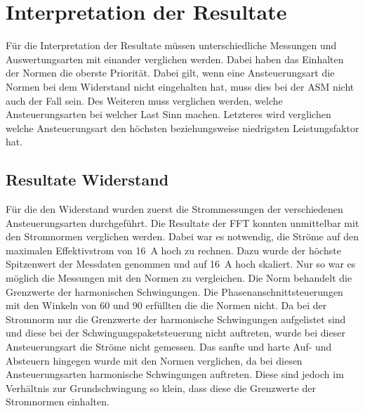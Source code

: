\section{Interpretation der Resultate}\label{sec:Interpretation_Resultate}
Für die Interpretation der Resultate müssen unterschiedliche Messungen und Auswertungsarten mit einander verglichen werden. Dabei haben das Einhalten der Normen die oberste Priorität. Dabei gilt, wenn eine Ansteuerungsart die Normen bei dem Widerstand nicht eingehalten hat, muss dies bei der ASM nicht auch der Fall sein. Des Weiteren muss verglichen werden, welche Ansteuerungsarten bei welcher Last Sinn machen. Letzteres wird verglichen welche Ansteuerungsart den höchsten beziehungsweise niedrigsten Leistungsfaktor hat. 

\subsection{Resultate Widerstand}
Für die den Widerstand wurden zuerst die Strommessungen der verschiedenen Ansteuerungsarten durchgeführt. Die Resultate der FFT konnten unmittelbar mit den Stromnormen  verglichen werden. Dabei war es notwendig, die Ströme auf den maximalen Effektivstrom von \SI{16}{A} hoch zu rechnen. Dazu wurde der höchste Spitzenwert der Messdaten genommen und auf \SI{16}{A} hoch skaliert. Nur so war es möglich die Messungen mit den Normen zu vergleichen. Die Norm behandelt die Grenzwerte der harmonischen Schwingungen. Die Phasenanschnittsteuerungen mit den Winkeln von 60\textdegree \hspace{0.02cm} und 90\textdegree \hspace{0.02cm} erfüllten die die Normen nicht. Da bei der Stromnorm nur die Grenzwerte der harmonische Schwingungen aufgelistet sind und diese bei der Schwingungspaketsteuerung nicht auftreten, wurde bei dieser Ansteuerungsart die Ströme nicht gemessen. Das sanfte und harte Auf- und Absteuern hingegen wurde mit den Normen verglichen, da bei diesen Ansteuerungsarten harmonische Schwingungen auftreten. Diese sind jedoch im Verhältnis zur Grundschwingung so klein, dass diese die Grenzwerte der Stromnormen einhalten. 

